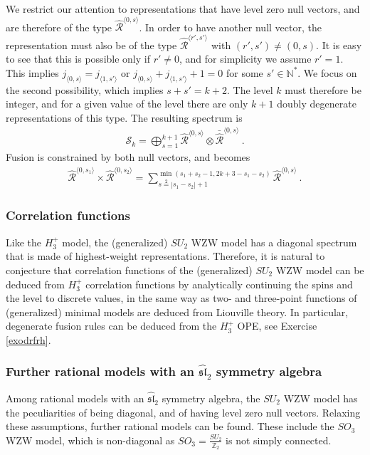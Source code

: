 \documentclass[12pt, a4paper, notitlepage, twoside]{report}
\numberwithin{equation}{section}
\theoremstyle{break}
\begin{document}
We restrict our attention to representations that have level zero null vectors, and are therefore of the type $\hat{\mathcal{R}}^{\langle 0, s\rangle}$. In order to have another null vector, the representation must also be of the type $\hat{\mathcal{R}}^{\langle r', s'\rangle}$ with $(r',s')\neq (0,s)$. It is easy to see that this is possible only if $r'\neq 0$, and for simplicity we assume $r'=1$. This implies $j_{\langle 0, s\rangle} = j_{\langle 1, s'\rangle} $ or $j_{\langle 0, s\rangle} + j_{\langle 1, s'\rangle} +1=0$ for some $s'\in\mathbb{N}^*$. We focus on the second possibility, which implies $s+s'=k+2$. The level $k$ must therefore be integer, and for a given value of the level there are only $k+1$ doubly degenerate representations of this type. The resulting spectrum is
\begin{align}
 \mathcal{S}_k = \bigoplus_{s=1}^{k+1} \hat{\mathcal{R}}^{\langle 0, s\rangle}\otimes \bar{\hat{\mathcal{R}}}^{\langle 0, s\rangle}\ .
\end{align}
Fusion is constrained by both null vectors, and becomes 
\begin{align}
 \hat{\mathcal{R}}^{\langle 0, s_1\rangle}\times\hat{\mathcal{R}}^{\langle 0, s_2\rangle} = \sum_{s\overset{2}{=}|s_1-s_2|+1}^{\min(s_1+s_2-1,2k+3-s_1-s_2)} \hat{\mathcal{R}}^{\langle 0, s\rangle}\ .
\end{align}

\subsubsection{Correlation functions}

Like the $H_3^+$ model, the (generalized) $SU_2$ WZW model has a diagonal spectrum that is made of highest-weight representations.
Therefore, it is natural to conjecture that correlation functions of the (generalized) $SU_2$ WZW model can be deduced from $H_3^+$ correlation functions by analytically continuing the spins and the level to discrete values, in the same way as two- and three-point functions of (generalized) minimal models  are deduced from Liouville theory. 
In particular, degenerate fusion rules can be deduced from the $H_3^+$ OPE, see Exercise \ref{exodrfrh}.

\subsubsection{Further rational models with an $\widehat{\mathfrak{sl}}_2$ symmetry algebra}

Among rational models with an $\widehat{\mathfrak{sl}}_2$ symmetry algebra,
the $SU_2$ WZW model has the peculiarities of being diagonal, and of having level zero null vectors. 
Relaxing these assumptions, further rational models can be found.
These include the $SO_3$ WZW model, which is non-diagonal as $SO_3 = \frac{SU_2}{\mathbb{Z}_2}$ is not simply connected.
\end{document}
